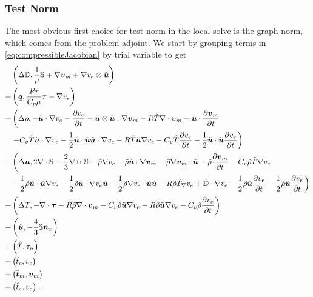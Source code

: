 \documentclass[Dissertation.tex]{subfiles}
\begin{document}
\subsubsection{Test Norm}
The most obvious first choice for test norm in the local solve is the graph norm, which comes from the 
problem adjoint.
We start by grouping terms in \eqref{eq:compressibleJacobian} by trial variable to get
\begin{equation}
\begin{aligned}
&\left( \Delta\mathbb{D},\frac{1}{\mu}\mathbb{S}+\nabla\boldsymbol v_m+\nabla v_e\otimes\tilde{\boldsymbol u} \right)\\
+&\left( \boldsymbol q,\frac{Pr}{C_p\mu}\boldsymbol\tau-\nabla v_e \right)\\
+&\left(\Delta\rho,-\tilde{\boldsymbol u}\cdot\nabla v_c-\frac{\partial v_c}{\partial t}
-\tilde{\boldsymbol u}\otimes\tilde{\boldsymbol u}:\nabla\boldsymbol v_m
-R\tilde T\nabla\cdot\boldsymbol v_m-\tilde{\boldsymbol u}\cdot\frac{\partial\boldsymbol v_m}{\partial t}\right.\\
&\left.-C_v\tilde T\tilde{\boldsymbol u}\cdot\nabla v_e-\frac{1}{2}\tilde{\boldsymbol u}\cdot\tilde{\boldsymbol u}\tilde{\boldsymbol u}\cdot\nabla v_e
-R\tilde T\tilde{\boldsymbol u}\nabla v_e
-C_v\tilde T\frac{\partial v_e}{\partial t}-\frac{1}{2}\tilde{\boldsymbol u}\cdot\tilde{\boldsymbol u}\frac{\partial v_e}{\partial t}
\right)\\
+&\left(\Delta\boldsymbol u,2\nabla\cdot\mathbb{S}-\frac{2}{3}\nabla\operatorname*{tr}{\mathbb{S}}
-\tilde\rho\nabla v_c
-\tilde\rho\tilde{\boldsymbol u}\cdot\nabla\boldsymbol v_m-\tilde\rho\nabla\boldsymbol v_m\cdot\tilde{\boldsymbol u}
-\tilde\rho\frac{\partial\boldsymbol v_m}{\partial t}
-C_v\tilde\rho\tilde T\nabla v_e\right.\\
&\left.
-\frac{1}{2}\tilde\rho\tilde{\boldsymbol u}\cdot\tilde{\boldsymbol u}\nabla v_e
-\frac{1}{2}\tilde\rho\tilde{\boldsymbol u}\cdot\nabla v_e\tilde{\boldsymbol u}
-\frac{1}{2}\tilde\rho\nabla v_e\cdot\tilde{\boldsymbol u}\tilde{\boldsymbol u}
-R\tilde\rho\tilde T_{\nabla} v_e
+\tilde{\mathbb{D}}\cdot\nabla v_e
-\frac{1}{2}\tilde\rho\tilde{\boldsymbol u}\frac{\partial v_e}{\partial t}
-\frac{1}{2}\tilde\rho\tilde{\boldsymbol u}\frac{\partial v_e}{\partial t}
\right)\\
+&\left(\Delta T,-\nabla\cdot\boldsymbol\tau
-R\tilde\rho\nabla\cdot\boldsymbol v_m
-C_v\tilde\rho\tilde{\boldsymbol u}\nabla v_e
-R\tilde\rho\tilde{\boldsymbol u}\nabla v_e
-C_v\tilde\rho\frac{\partial v_e}{\partial t}
\right)\\
+&\left( \hat{\boldsymbol u},-\frac{4}{3}\mathbb{S}\boldsymbol n_x \right)\\
+&\left( \hat T,\tau_n \right)\\
+&\left( \hat t_c,v_c \right)\\
+&\left( \hat{\boldsymbol t}_m,\boldsymbol v_m \right)\\
+&\left( \hat t_e,v_e \right)\,.
\end{aligned}	
\end{equation}
\end{document}
